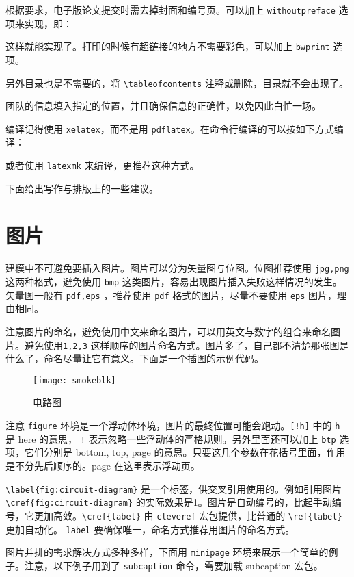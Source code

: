 \documentclass[withoutpreface,bwprint]{cumcmthesis} %
\begin{document}
根据要求，电子版论文提交时需去掉封面和编号页。可以加上 \verb|withoutpreface|  选项来实现，即：

这样就能实现了。打印的时候有超链接的地方不需要彩色，可以加上 \verb|bwprint| 选项。

另外目录也是不需要的，将 \verb|\tableofcontents| 注释或删除，目录就不会出现了。

团队的信息填入指定的位置，并且确保信息的正确性，以免因此白忙一场。

编译记得使用 \verb|xelatex|，而不是用 \verb|pdflatex|。在命令行编译的可以按如下方式编译：

或者使用 \verb|latexmk| 来编译，更推荐这种方式。


下面给出写作与排版上的一些建议。

\section{图片}

建模中不可避免要插入图片。图片可以分为矢量图与位图。位图推荐使用 \verb|jpg,png| 这两种格式，避免使用 \verb|bmp| 这类图片，容易出现图片插入失败这样情况的发生。矢量图一般有 \verb|pdf,eps| ，推荐使用 \verb|pdf|  格式的图片，尽量不要使用 \verb|eps| 图片，理由相同。

注意图片的命名，避免使用中文来命名图片，可以用英文与数字的组合来命名图片。避免使用\verb|1,2,3| 这样顺序的图片命名方式。图片多了，自己都不清楚那张图是什么了，命名尽量让它有意义。下面是一个插图的示例代码。
\begin{figure}[!h]
    \centering
    \texttt{[image: smokeblk]}
    \caption{电路图}
    \label{fig:circuit-diagram}
\end{figure}

注意 \verb|figure| 环境是一个浮动体环境，图片的最终位置可能会跑动。\verb|[!h]| 中的 \verb|h| 是 here 的意思， \verb|!| 表示忽略一些浮动体的严格规则。另外里面还可以加上 \verb|btp| 选项，它们分别是 bottom, top, page 的意思。只要这几个参数在花括号里面，作用是不分先后顺序的。page 在这里表示浮动页。

\verb|\label{fig:circuit-diagram}| 是一个标签，供交叉引用使用的。例如引用图片 \verb|\cref{fig:circuit-diagram}| 的实际效果是\cref{fig:circuit-diagram}。图片是自动编号的，比起手动编号，它更加高效。\verb|\cref{label}| 由 \verb|cleveref| 宏包提供，比普通的 \verb|\ref{label}| 更加自动化。 \verb|label| 要确保唯一，命名方式推荐用图片的命名方式。

图片并排的需求解决方式多种多样，下面用 \verb|minipage| 环境来展示一个简单的例子。注意，以下例子用到了 \verb|subcaption| 命令，需要加载 subcaption 宏包。
\end{document}
